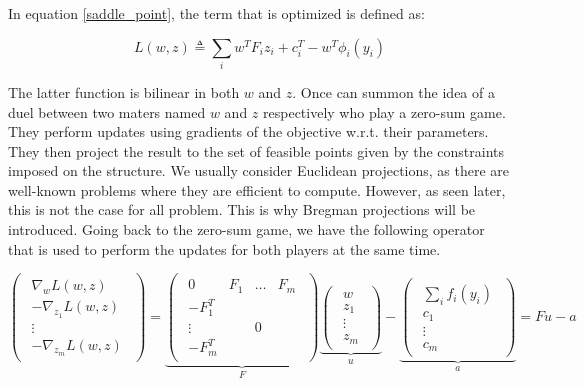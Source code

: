 In equation \ref{saddle_point}, the term that is optimized is defined
as:

\begin{equation}
  {L}( w, z) \triangleq \sum_i  w^T  F_i  z_i + 
c_i^T -  w^T  \phi_i( y_i)
  \label{saddle_obj}
\end{equation}


\clearpage

The latter function is bilinear in both $w$ and $z$. Once can summon the idea of
a duel between two maters named $w$ and $ z$ respectively who play a zero-sum
game. They perform updates using gradients of the objective w.r.t. their
parameters. They then project the result to the set of feasible points given by
the constraints imposed on the structure. We usually consider Euclidean
projections, as there are well-known problems where they are efficient to
compute. However, as seen later, this is not the case for all problem. This is
why Bregman projections will be introduced. Going back to the zero-sum game, we
have the following operator that is used to perform the updates for both players
at the same time.

\begin{equation}
  \begin{pmatrix}
    \begin{array}{c} \nabla_{ w} {L}( w, z)\\
      -\nabla_{ z_1} {L}( w, z)\\
      \vdots\\
      -\nabla_{ z_m} {L}( w, z)
    \end{array}
  \end{pmatrix} =
  \underbrace{
    \begin{pmatrix}
      \begin{array}{cccc}
        0 &  F_1 & \dots &  F_m\\
        - F_1^T & & &\\
        \vdots & &  0 &\\
        - F_m^T & & &
      \end{array}
    \end{pmatrix}}_{ F}
  \underbrace{
    \begin{pmatrix}
      \begin{array}{c}
         w\\
         z_1\\
        \vdots\\
         z_m
      \end{array}
    \end{pmatrix}}_{ u}-
  \underbrace{
    \begin{pmatrix}
      \begin{array}{c}
        \sum_i  f_i( y_i)\\
         c_1\\
        \vdots\\
         c_m
      \end{array}
    \end{pmatrix}}_{ a} =  F  u -  a
  \end{equation}


